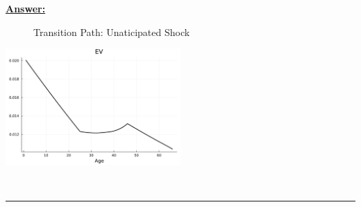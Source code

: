 \documentclass{article} %
\theoremstyle{definition}
\newenvironment{solution}[1][Answer]{\begin{singlespace}\underline{\textbf{#1:}}\quad }{\ \rule{0.3em}{0.3em}\end{singlespace}} %
\begin{document}
\begin{enumerate}
\begin{solution}
\begin{figure}
\begin{subfigure}[b]{0.475\textwidth}
      \end{subfigure}
      \caption{Transition Path: Unaticipated Shock}
      \label{fig}
    \end{figure}
    \clearpage
    \begin{center}
      \includegraphics[width=0.5\textwidth]{Figures/EV_ex2.pdf}
    \end{center}
  \end{solution}
\end{enumerate}
\end{document}
